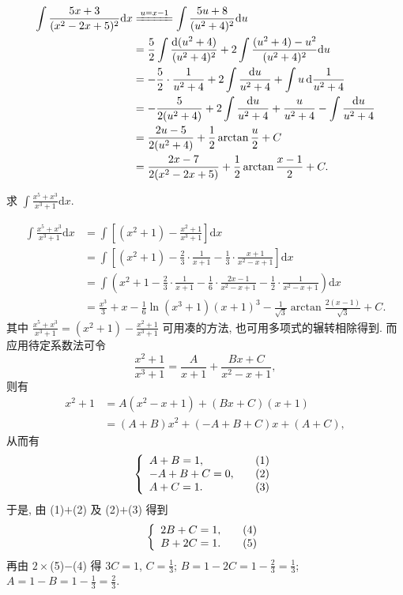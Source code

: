 \begin{solution}[解法 2]
\begin{align*}
\int\frac{5x+3}{(x^{2}-2x+5)^{2}}\mathrm{d}x
&\xlongequal{u=x-1}\int\frac{5u+8}{(u^{2}+4)^{2}}\mathrm{d}u\\
&=\frac{5}{2}\int\frac{\mathrm{d}(u^{2}+4)}{(u^{2}+4)^{2}}+2\int\frac{(u^{2}+4)-u^{2}}{(u^{2}+4)^{2}}\mathrm{d}u\\
&=-\frac{5}{2}\cdot\frac{1}{u^{2}+4}+2\int\frac{\mathrm{d}u}{u^{2}+4}+\int u\,\mathrm{d}\frac{1}{u^{2}+4}\\
&=-\frac{5}{2(u^{2}+4)}+2\int\frac{\mathrm{d}u}{u^{2}+4}+\frac{u}{u^{2}+4}-\int\frac{\mathrm{d}u}{u^{2}+4}\\
&=\frac{2u-5}{2(u^{2}+4)}+\frac{1}{2}\arctan\frac{u}{2}+C\\
&=\frac{2x-7}{2(x^{2}-2x+5)}+\frac{1}{2}\arctan\frac{x-1}{2}+C.
\end{align*}
\end{solution}

\begin{example}\label{ex:5.3.5}
求 $\int\frac{x^{5}+x^{3}}{x^{3}+1}\mathrm{d}x$.
\end{example}

\begin{solution}
\begin{align*}
\int\frac{x^{5}+x^{3}}{x^{3}+1}\mathrm{d}x
&=\int\left[(x^{2}+1)-\frac{x^{2}+1}{x^{3}+1}\right]\mathrm{d}x\\
&=\int\left[(x^{2}+1)-\frac{2}{3}\cdot\frac{1}{x+1}-\frac{1}{3}\cdot\frac{x+1}{x^{2}-x+1}\right]\mathrm{d}x\\
&=\int\left(x^{2}+1-\frac{2}{3}\cdot\frac{1}{x+1}-\frac{1}{6}\cdot\frac{2x-1}{x^{2}-x+1}-\frac{1}{2}\cdot\frac{1}{x^{2}-x+1}\right)\mathrm{d}x\\
&=\frac{x^{3}}{3}+x-\frac{1}{6}\ln(x^{3}+1)(x+1)^{3}-\frac{1}{\sqrt{3}}\arctan\frac{2(x-1)}{\sqrt{3}}+C.
\end{align*}
其中 $\frac{x^{5}+x^{3}}{x^{3}+1}=(x^{2}+1)-\frac{x^{2}+1}{x^{3}+1}$ 可用凑的方法, 也可用多项式的辗转相除得到. 而应用待定系数法可令
\[
\frac{x^{2}+1}{x^{3}+1}=\frac{A}{x+1}+\frac{Bx+C}{x^{2}-x+1},
\]
则有
\begin{align*}
x^{2}+1&=A(x^{2}-x+1)+(Bx+C)(x+1)\\
&=(A+B)x^{2}+(-A+B+C)x+(A+C),
\end{align*}
从而有
\[
\left\{\begin{array}
{l@{\qquad}r}
A+B=1, & \text{(1)}\\
-A+B+C=0, & \text{(2)}\\
A+C=1. & \text{(3)}
\end{array}\right.
\]
于是, 由 (1)$+$(2) 及 (2)$+$(3) 得到
\[
\left\{\begin{array}
{l@{\qquad}r}
2B+C=1, & \text{(4)}\\
B+2C=1. & \text{(5)}
\end{array}\right.
\]
再由 $2\times$(5)$-$(4) 得 $3C=1$, $C=\frac{1}{3}$; $B=1-2C=1-\frac{2}{3}=\frac{1}{3}$; $A=1-B=1-\frac{1}{3}=\frac{2}{3}$.
\end{solution}

